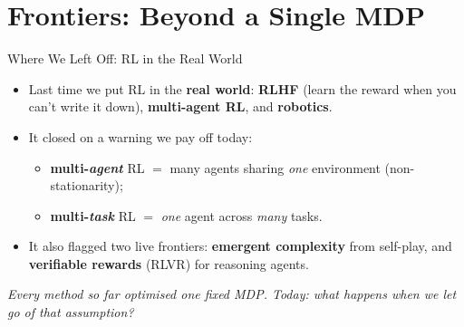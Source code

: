 \section{Frontiers: Beyond a Single MDP}


\newcommand{\srcnote}[1]{%
  \begingroup
  \renewcommand{\thefootnote}{}%
  \footnote{#1}%
  \addtocounter{footnote}{-1}%
  \endgroup}

\begin{frame}{Where We Left Off: RL in the Real World}
\begin{itemize}\itemsep0.5em
    \item Last time we put RL in the \textbf{real world}: \textbf{RLHF} (learn the reward
          when you can't write it down), \textbf{multi-agent RL}, and \textbf{robotics}.
    \item It closed on a warning we pay off today:
          \begin{itemize}
              \item \textbf{multi-\emph{agent}} RL $=$ many agents sharing \emph{one}
                    environment (non-stationarity);
              \item \textbf{multi-\emph{task}} RL $=$ \emph{one} agent across \emph{many}
                    tasks. 
          \end{itemize}
    \item It also flagged two live frontiers: \textbf{emergent complexity} from self-play,
          and \textbf{verifiable rewards} (RLVR) for reasoning agents.
\end{itemize}
\vfill
\begin{center}
\itshape Every method so far optimised \emph{one} fixed MDP. Today: what happens when
we let go of that assumption?
\end{center}
\end{frame}

